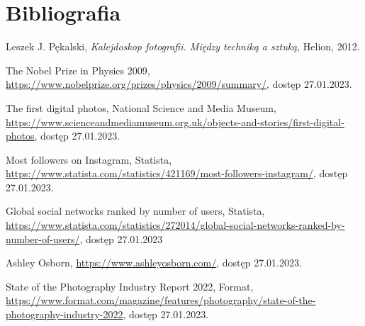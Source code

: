 \documentclass[a4paper, 12pt]{article}
\numberwithin{figure}{section}
\begin{document}
\begin{sloppypar}

\newpage 

%
    \listoftables
    \clearpage


\newpage 

%
    \listofcodes
    \clearpage


\newpage 

\section*{Bibliografia}
    \renewcommand{\section}[2]{}
    
\begin{thebibliography}{99}

    Leszek J. Pękalski,
    \textit{Kalejdoskop fotografii. Między techniką a sztuką},
    Helion,
    2012.

    The Nobel Prize in Physics 2009,
    \url{https://www.nobelprize.org/prizes/physics/2009/summary/}, 
    dostęp 27.01.2023.

    The first digital photos, National Science and Media Museum,
    \url{https://www.scienceandmediamuseum.org.uk/objects-and-stories/first-digital-photos},
    dostęp 27.01.2023.

    Most followers on Instagram, Statista,
    \url{https://www.statista.com/statistics/421169/most-followers-instagram/},
    dostęp 27.01.2023.

    Global social networks ranked by number of users, Statista,
    \url{https://www.statista.com/statistics/272014/global-social-networks-ranked-by-number-of-users/},
    dostęp 27.01.2023

    Ashley Osborn,
    \url{https://www.ashleyosborn.com/},
    dostęp 27.01.2023.

    State of the Photography Industry Report 2022, Format,
    \url{https://www.format.com/magazine/features/photography/state-of-the-photography-industry-2022},
    dostęp 27.01.2023.


\end{thebibliography}
\end{sloppypar}
\end{document}
